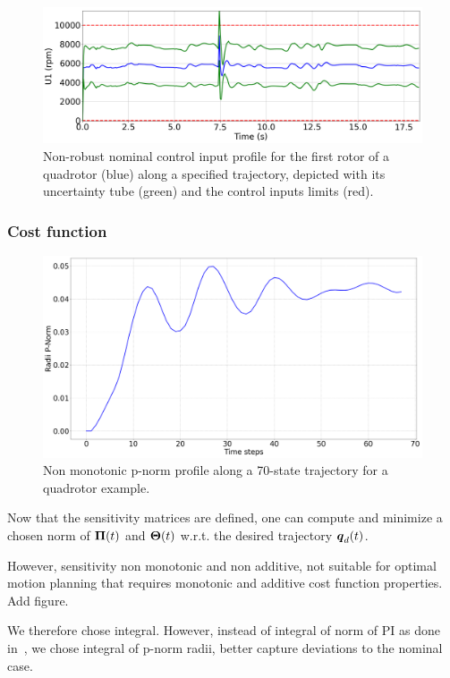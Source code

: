 \begin{figure} [t]
    \centering
    \includegraphics[width=0.8\linewidth]{figures/samp/Invalid_Inputs.png} 
    \caption{Non-robust nominal control input profile for the first rotor of a quadrotor (blue) along a specified trajectory, depicted with its uncertainty tube (green) and the control inputs limits (red).}%
    \label{fig:invalid_inputs}%
\end{figure}

\subsubsection{Cost function}\label{sec:sensi_cost}

\begin{figure} [t]
    \centering
    \includegraphics[width=0.8\linewidth]{figures/samp/non_monotoic.png} 
    \caption{Non monotonic p-norm profile along a 70-state trajectory for a quadrotor example.}%
    \label{fig:monotonic}%
\end{figure}

Now that the sensitivity matrices are defined, one can compute and minimize a chosen norm of $\boldsymbol{\Pi}(t)$ and $\boldsymbol{\Theta}(t)$ w.r.t. the desired trajectory $\boldsymbol{q}_d(t)$.

However, sensitivity non monotonic and non additive, not suitable for optimal motion planning that requires monotonic and additive cost function properties.
Add figure.

We therefore chose integral.
However, instead of integral of norm of PI as done in~\cite{cPi,cTh}, we chose integral of p-norm radii, better capture deviations to the nominal case.

